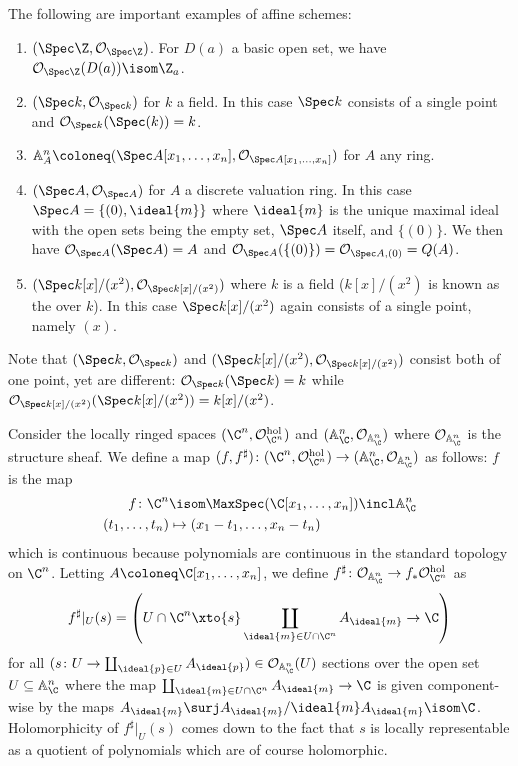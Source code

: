 \documentclass[wip, algebra]{bsteffan-lecturenotes}
\newcommand{\cO}{\mathcal{O}}
\newcommand{\A}{\mathbb{A}}
\begin{document}
\begin{example}
	The following are important examples of affine schemes:
	\begin{enumerate}
		\item $(\Spec \Z, \cO_{\Spec \Z})$.
			For $D(a)$ a basic open set, we have $\cO_{\Spec \Z}(D(a)) \isom \Z_a$.
		\item $(\Spec k, \cO_{\Spec k})$ for $k$ a field.
			In this case $\Spec k$ consists of a single point and $\cO_{\Spec k}(\Spec(k)) = k$.
		\item $\A^n_A \coloneq (\Spec A[x_1, \ldots, x_n], \cO_{\Spec A[x_1, \ldots, x_n]})$ for $A$ any ring.
		\item $(\Spec A, \cO_{\Spec A})$ for $A$ a discrete valuation ring.
			In this case $\Spec A = \{(0), \ideal{m}\}$ where $\ideal{m}$ is the unique maximal ideal with the open sets being the empty set, $\Spec A$ itself, and $\{(0)\}$.
			We then have $\cO_{\Spec A}(\Spec A) = A$ and $\cO_{\Spec A}(\{(0)\}) = \cO_{\Spec A, (0)} = Q(A)$.
		\item $(\Spec k[x]/(x^2), \cO_{\Spec k[x]/(x^2)})$ where $k$ is a field ($k[x] / (x^2)$ is known as the  over $k$).
			In this case $\Spec k[x]/(x^2)$ again consists of a single point, namely $(x)$.
	\end{enumerate}
\end{example}
Note that $(\Spec k, \cO_{\Spec k})$ and $(\Spec k[x]/(x^2), \cO_{\Spec k[x]/(x^2)})$ consist both of one point, yet are different: $\cO_{\Spec k}(\Spec k) = k$ while $\cO_{\Spec k[x]/(x^2)}(\Spec k[x]/(x^2)) = k[x] / (x^2)$.
\begin{example}
	Consider the locally ringed spaces $(\C^n, \cO^\mathrm{hol}_{\C^n})$ and $(\A^n_\C, \cO_{\A^n_\C})$ where $\cO_{\A^n_\C}$ is the structure sheaf.
	We define a map $(f, f^\sharp)\colon (\C^n, \cO^\mathrm{hol}_{\C^n}) \to (\A^n_\C, \cO_{\A^n_\C})$ as follows:
	$f$ is the map 
	\begin{align*}
		f\colon \C^n &\isom \MaxSpec(\C[x_1, \ldots, x_n]) \incl \A^n_\C \\
		(t_1, \ldots, t_n) &\mapsto (x_1 - t_1, \ldots, x_n - t_n)
	\end{align*}
	which is continuous because polynomials are continuous in the standard topology on $\C^n$.
	Letting $A \coloneq \C[x_1, \ldots, x_n]$, we define $f^\sharp\colon \cO_{\A^n_\C} \to f_* \cO^\mathrm{hol}_{\C^n}$ as
	\begin{equation*}
		f^\sharp|_U(s) = \left(U \cap \C^n \xto{s} \coprod_{\ideal{m} \in U \cap \C^n} A_{\ideal{m}} \to \C\right)
	\end{equation*}
	for all $(s\colon U \to \coprod_{\ideal{p} \in U} A_{\ideal{p}}) \in \cO_{\A^n_\C}(U)$ sections over the open set $U \subseteq \A^n_\C$ where the map $\coprod_{\ideal{m} \in U \cap \C^n} A_{\ideal{m}} \to \C$ is given component-wise by the maps $A_{\ideal{m}} \surj A_{\ideal{m}} / \ideal{m} A_{\ideal{m}} \isom \C$.
	Holomorphicity of $f^\sharp|_U(s)$ comes down to the fact that $s$ is locally representable as a quotient of polynomials which are of course holomorphic.
\end{example}
\end{document}
